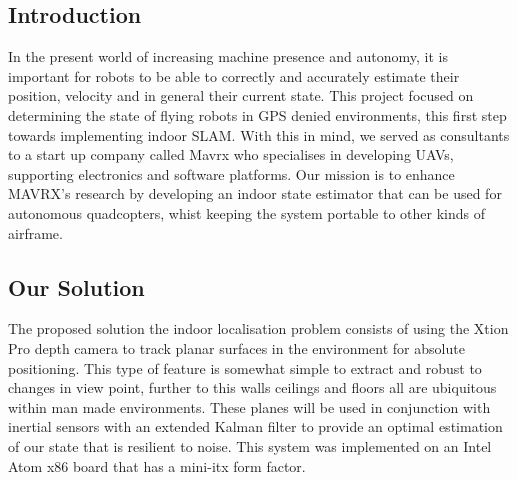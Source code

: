 \documentclass[]{article}
\begin{document}
{\subsection{Introduction}
In the present world of increasing machine presence and autonomy, it is important for robots to be able to correctly and accurately estimate their position, velocity and in general their current state. This project focused on determining the state of flying robots in GPS denied environments, this first step towards implementing indoor SLAM. With this in mind, we served as consultants to a start up company called Mavrx who specialises in developing UAVs, supporting electronics and software platforms. Our mission is to enhance MAVRX's  research by developing an indoor state estimator that can be used for autonomous quadcopters, whist keeping the system portable to other kinds of airframe.
\subsection{Our Solution}
The proposed solution the indoor localisation problem consists of using the Xtion Pro depth camera to track planar surfaces in the environment for absolute positioning. This type of feature is somewhat simple to extract and robust to changes in view point, further to this walls ceilings and floors all are ubiquitous within man made environments. These planes will be used in conjunction with inertial sensors with an extended Kalman filter to provide an optimal estimation of our state that is resilient to noise. This system was implemented on an Intel Atom x86 board that has a mini-itx form factor.


}
\end{document}
